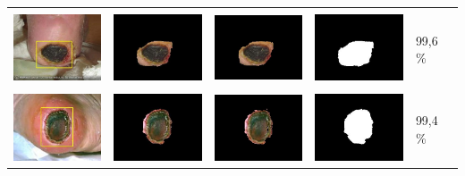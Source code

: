 \begin{table}[H]
\begin{tabular}{|m{1.1in}|m{1.1in}|m{1.1in}|m{1.1in}|m{0.7in}|}
		&  &  & \\
		\includegraphics[width=1.1in]{gambar/hasil_segmentasi/luka_hitam/image_6_rect.jpg} \fontsize{8}{12}{(83, 97, 130, 97)}&
		\includegraphics[width=1.1in]{gambar/hasil_segmentasi/luka_hitam/result_6.jpg}&
		\includegraphics[width=1.1in]{gambar/hasil_segmentasi/luka_hitam/result_6_cv.jpg}&
		\includegraphics[width=1.1in]{gambar/hasil_segmentasi/luka_hitam/mask_6.jpg}&
		99,6 \% \\
		\hline
		
		&  &  & \\
		\includegraphics[width=1.1in]{gambar/hasil_segmentasi/luka_hitam/image_7_rect.jpg} \fontsize{8}{12}{(100, 50, 117, 142)}&
		\includegraphics[width=1.1in]{gambar/hasil_segmentasi/luka_hitam/result_7.jpg}&
		\includegraphics[width=1.1in]{gambar/hasil_segmentasi/luka_hitam/result_7_cv.jpg}&
		\includegraphics[width=1.1in]{gambar/hasil_segmentasi/luka_hitam/mask_7.jpg}&
		99,4 \% \\
		\hline
	\end{tabular}
\end{table}

